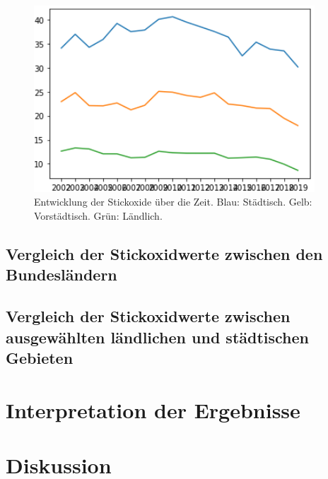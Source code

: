 \documentclass[11pt,a4paper,oneside,german]{article}
\begin{document}
\begin{figure}[h]
	\centering
	\includegraphics[width=10.5cm]{NO2Entwicklung.png}
	\caption{Entwicklung der Stickoxide über die Zeit. Blau: Städtisch. Gelb: Vorstädtisch. Grün: Ländlich.}
	\label{fig:NO2Entwicklung}
\end{figure}

\subsection{Vergleich der Stickoxidwerte zwischen den Bundesländern}

\subsection{Vergleich der Stickoxidwerte zwischen ausgewählten ländlichen und städtischen Gebieten}

\section{Interpretation der Ergebnisse}

\section{Diskussion}
\end{document}

